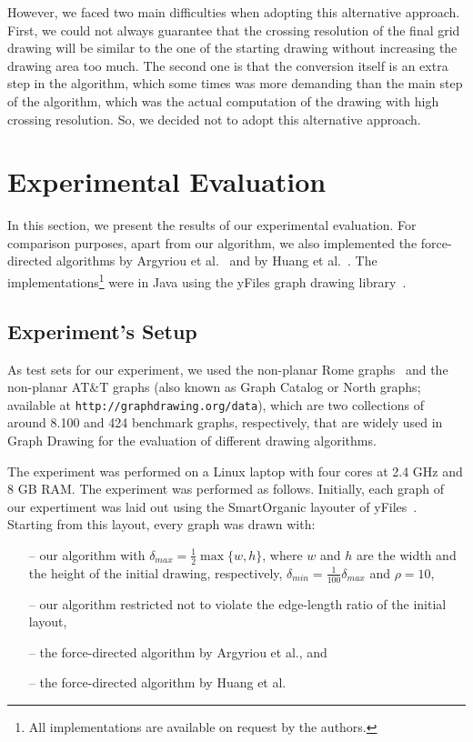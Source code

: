 \documentclass{comjnl}
\begin{document}
However, we faced two main difficulties when adopting this alternative approach. First, we could not always guarantee that the crossing resolution of the final grid drawing will be similar to the one of the starting drawing without increasing the drawing area too much. The second one is that the conversion itself is an extra step in the algorithm, which some times was more demanding than the main step of the algorithm, which was the actual computation of the drawing with high crossing resolution. So, we decided not to adopt this alternative approach.

\section{Experimental Evaluation}
\label{sec:experiments}

In this section, we present the results of our experimental evaluation. For comparison purposes, apart from our algorithm, we also implemented the force-directed algorithms by Argyriou et al.~\cite{DBLP:journals/cj/ArgyriouBS13} and by Huang et al.~\cite{DBLP:journals/vlc/HuangEHL13}. The implementations\footnote{All implementations are available on request by the authors.} were in Java using the yFiles graph drawing library~\cite{DBLP:books/sp/04/WieseE004}. 

\subsection{Experiment's Setup}
\label{ssec:setup}

As test sets for our experiment, we used the non-planar Rome graphs~\cite{DBLP:reference/crc/BattistaD13} and the non-planar AT\&T graphs (also known as Graph Catalog or North graphs; available at \texttt{http://graphdrawing.org/data}), which are two collections of around 8.100 and 424 benchmark graphs, respectively, that are widely used in Graph Drawing for the evaluation of different drawing algorithms. 

The experiment was performed on a Linux laptop with four cores at 2.4 GHz and 8 GB RAM. The experiment was performed as follows. Initially, each graph of our expertiment was laid out using the SmartOrganic layouter of yFiles~\cite{DBLP:books/sp/04/WieseE004}. Starting from this layout, every graph was drawn with:
%
\begin{itemize}
\item[--] our algorithm with $\delta_{max}=\frac{1}{2}\max\{w,h\}$, where $w$ and $h$ are the width and the height of the initial drawing, respectively, $\delta_{min}=\frac{1}{100}\delta_{max}$ and $\rho=10$,
\item[--] our algorithm restricted not to violate the edge-length ratio of the initial layout, 
\item[--] the force-directed algorithm by Argyriou et al., and
\item[--] the force-directed algorithm by Huang et al.
\end{itemize}
\end{document}
